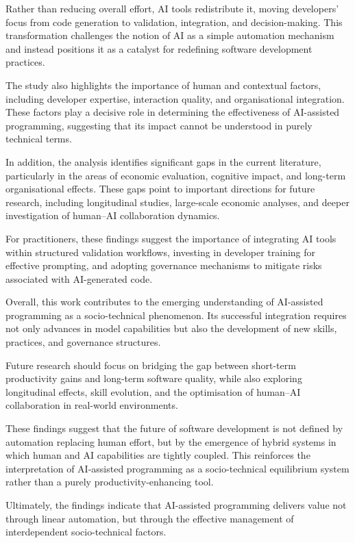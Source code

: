 \documentclass[conference]{IEEEtran}
\begin{document}
Rather than reducing overall effort, AI tools redistribute it, moving developers' focus from code generation to validation, integration, and decision-making. This transformation challenges the notion of AI as a simple automation mechanism and instead positions it as a catalyst for redefining software development practices.

The study also highlights the importance of human and contextual factors, including developer expertise, interaction quality, and organisational integration. These factors play a decisive role in determining the effectiveness of AI-assisted programming, suggesting that its impact cannot be understood in purely technical terms.

In addition, the analysis identifies significant gaps in the current literature, particularly in the areas of economic evaluation, cognitive impact, and long-term organisational effects. These gaps point to important directions for future research, including longitudinal studies, large-scale economic analyses, and deeper investigation of human--AI collaboration dynamics.

For practitioners, these findings suggest the importance of integrating AI tools within structured validation workflows, investing in developer training for effective prompting, and adopting governance mechanisms to mitigate risks associated with AI-generated code.

Overall, this work contributes to the emerging understanding of AI-assisted programming as a socio-technical phenomenon. Its successful integration requires not only advances in model capabilities but also the development of new skills, practices, and governance structures.

Future research should focus on bridging the gap between short-term productivity gains and long-term software quality, while also exploring longitudinal effects, skill evolution, and the optimisation of human--AI collaboration in real-world environments.

These findings suggest that the future of software development is not defined by automation replacing human effort, but by the emergence of hybrid systems in which human and AI capabilities are tightly coupled. This reinforces the interpretation of AI-assisted programming as a socio-technical equilibrium system rather than a purely productivity-enhancing tool.

Ultimately, the findings indicate that AI-assisted programming delivers value not through linear automation, but through the effective management of interdependent socio-technical factors.



\end{document}
